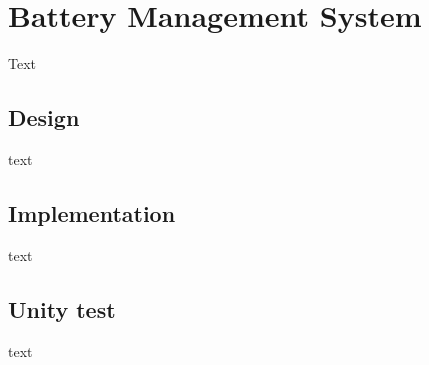 \section{Battery Management System}
Text

\subsection{Design}
text

\subsection{Implementation}
text

\subsection{Unity test}
text